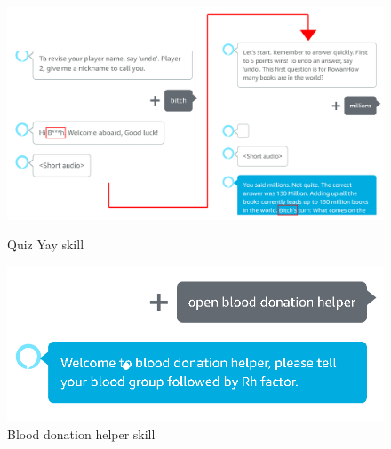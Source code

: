 \documentclass{article}
\begin{document}
\begin{figure}[!tbp]
\begin{minipage}[t]{0.45\textwidth}
\centering
\includegraphics[width=\textwidth]{9014_3.png}
\caption{Quiz Yay skill}\label{Images/quiz yay conversation part.png}
\end{minipage}
\begin{minipage}[t]{0.45\textwidth}
\centering
\includegraphics[width=\textwidth]{9014_4.png}
\caption{Blood donation helper skill} \label{Images/blood donation helper conversation.png}
\end{minipage}
\end{figure}
\end{document}
